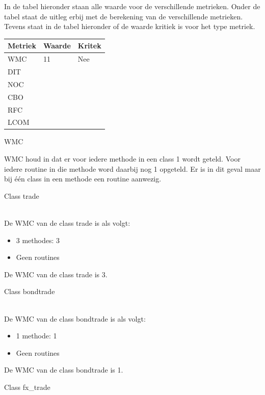 \documentclass[a4paper,titlepage]{artikel1}
\begin{document}
   In de tabel hieronder staan alle waarde voor de verschillende metrieken. Onder de tabel staat de uitleg erbij met de berekening van de verschillende metrieken. Tevens staat in de tabel hieronder of de waarde kritiek is voor het type metriek.
   \begin{center}
     \begin{tabular}{|l||l|l|}
       \hline
       Metriek & Waarde & Kritek \\
       \hline
       WMC & 11 & Nee \\
       \hline
       DIT & & \\
       \hline
       NOC & & \\
       \hline
       CBO & & \\
       \hline
       RFC & & \\
       \hline
       LCOM & & \\
       \hline
      \end{tabular}
   \end{center}
   \begin{center}\begin{bf}WMC\end{bf}\end{center}
   WMC houd in dat er voor iedere methode in een class 1 wordt geteld. Voor iedere routine in die methode word daarbij nog 1 opgeteld. Er is in dit geval maar bij één class in een methode een routine aanwezig.
   \begin{bf}Class trade\end{bf}\\
     De WMC van de class trade is als volgt:
     \begin{itemize}
       \item 3 methodes: 3
       \item Geen routines
     \end{itemize}
     De WMC van de class trade is 3.\\
   \begin{bf}Class bondtrade\end{bf}\\
     De WMC van de class bondtrade is als volgt:
     \begin{itemize}
       \item 1 methode: 1
       \item Geen routines
     \end{itemize}
     De WMC van de class bondtrade is 1.\\
    \begin{bf}Class fx\_trade\end{bf}\\
\end{document}
